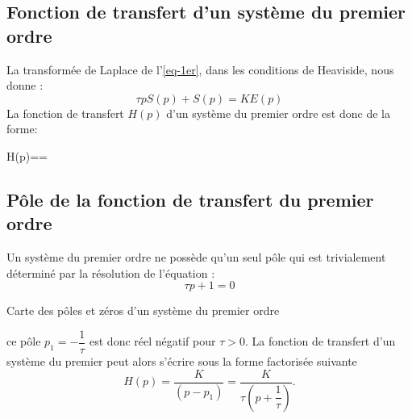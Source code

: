 \subsection{Fonction de transfert d'un système du premier ordre}
La transformée de Laplace de l'\cref{eq-1er}, dans les conditions de 
Heaviside, nous donne :
\[
\tau pS(p)+S(p)=KE(p)
\]
La fonction de transfert $H(p)$ d'un système du premier ordre est 
donc de la forme:
\begin{bequation}
    H(p)==\label{eq-ft1er}
\end{bequation}
\subsection{Pôle de la fonction de transfert du premier ordre}
Un système du premier ordre ne possède qu'un seul pôle qui est trivialement 
déterminé par la résolution de l'équation :
\[
\tau p + 1 =0
\]
\begin{marginfigure}
    \centering
    \caption*{Carte des pôles et zéros d'un système du premier ordre}
\end{marginfigure}
ce pôle $p_1=-\dfrac{1}{\tau}$ est donc réel négatif pour $\tau>0$.
La fonction de transfert d'un système du premier peut alors s'écrire 
sous la forme factorisée suivante
\[
H(p)=\dfrac{K}{(p-p_1)}=\dfrac{K}{\tau\left(p+\dfrac{1}{\tau}\right)}.
\]

